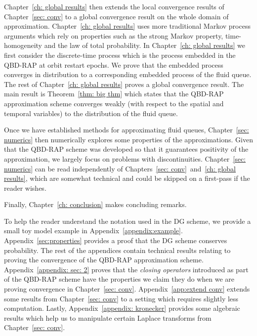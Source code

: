 Chapter~\ref{ch: global results} then extends the local convergence results of Chapter~\ref{sec: conv} to a global convergence result on the whole domain of approximation. Chapter~\ref{ch: global results} uses more traditional Markov process arguments which rely on properties such as the strong Markov property, time-homogeneity and the law of total probability. In Chapter~\ref{ch: global results} we first consider the discrete-time process which is the process embedded in the QBD-RAP at orbit restart epochs. We prove that the embedded process converges in distribution to a corresponding embedded process of the fluid queue. The rest of Chapter~\ref{ch: global results} proves a global convergence result. The main result is Theorem~\ref{thm: big thm} which states that the QBD-RAP approximation scheme converges weakly (with respect to the spatial and temporal variables) to the distribution of the fluid queue. 

Once we have established methods for approximating fluid queues, Chapter~\ref{sec: numerics} then numerically explores some properties of the approximations. Given that the QBD-RAP scheme was developed so that it guarantees positivity of the approximation, we largely focus on problems with discontinuities. Chapter~\ref{sec: numerics} can be read independently of Chapters~\ref{sec: conv}~and~\ref{ch: global results}, which are somewhat technical and could be skipped on a first-pass if the reader wishes. 

Finally, Chapter~\ref{ch: conclusion} makes concluding remarks. 

To help the reader understand the notation used in the DG scheme, we provide a small toy model example in Appendix~\ref{appendix:example}. Appendix~\ref{sec:properties} provides a proof that the DG scheme conserves probability. The rest of the appendices contain technical results relating to proving the convergence of the QBD-RAP approximation scheme. Appendix~\ref{appendix: sec: 2} proves that the \emph{closing operators} introduced as part of the QBD-RAP scheme have the properties we claim they do when we are proving convergence in Chapter~\ref{sec: conv}. Appendix~\ref{app:extend conv} extends some results from Chapter~\ref{sec: conv} to a setting which requires slightly less computation. Lastly, Appendix~\ref{appendix: kronecker} provides some algebraic results which help us to manipulate certain Laplace transforms from Chapter~\ref{sec: conv}.
